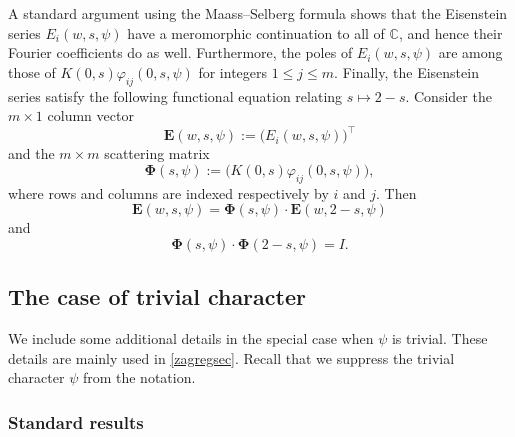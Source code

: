 \documentclass[12pt,reqno]{amsart}
\numberwithin{equation}{section}
\begin{document}
A standard argument using the Maass--Selberg formula \cite{Sel,Pat1} shows that the Eisenstein series $E_{i}(w,s,\psi)$ have a meromorphic continuation to all of $\mathbb{C}$, and hence their Fourier coefficients do as well. Furthermore, the poles of $E_{i}(w,s,\psi)$ are among those of
$K(0,s) \varphi_{i j}(0,s,\psi)$ for integers $1\leq j \leq m$. Finally, the Eisenstein series satisfy the following functional equation relating $s \mapsto 2-s$. Consider the $m \times 1$ column vector
\begin{equation} \label{topvec}
    \boldsymbol{E}(w,s,\psi):=\big(E_{i}(w,s,\psi) \big)^{\top}
\end{equation}
and the $m \times m$ scattering matrix
\begin{equation} \label{Phidef}
    \boldsymbol{\Phi}(s,\psi):=\big(K(0,s) \varphi_{i j}(0,s,\psi) \big),
\end{equation}
where rows and columns are indexed respectively by $i$ and $j$. Then
\begin{equation} \label{Efunceq}
    \boldsymbol{E}(w,s,\psi)= \boldsymbol{\Phi}(s,\psi) \cdot \boldsymbol{E}(w,2-s,\psi)
\end{equation}
and
\begin{equation} \label{phifunc}
    \boldsymbol{\Phi}(s,\psi) \cdot \boldsymbol{\Phi}(2-s,\psi)=I.
\end{equation}

\subsection{The case of trivial character}\label{trivial_char_section}

We include some additional details in the special case when $\psi$ is trivial. These details are mainly used in \cref{zagregsec}. Recall that we suppress the trivial character $\psi$ from the notation.

\subsubsection{Standard results} \label{standard}
\end{document}

